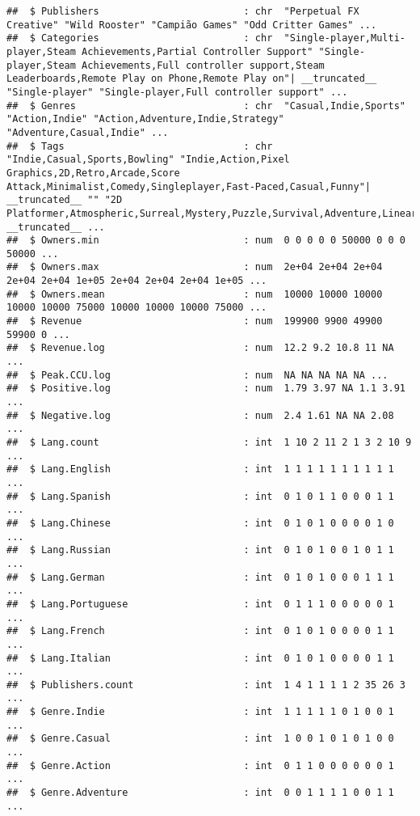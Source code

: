 \documentclass[
]{article}
\begin{document}
\begin{verbatim}
##  $ Publishers                         : chr  "Perpetual FX Creative" "Wild Rooster" "Campião Games" "Odd Critter Games" ...
##  $ Categories                         : chr  "Single-player,Multi-player,Steam Achievements,Partial Controller Support" "Single-player,Steam Achievements,Full controller support,Steam Leaderboards,Remote Play on Phone,Remote Play on"| __truncated__ "Single-player" "Single-player,Full controller support" ...
##  $ Genres                             : chr  "Casual,Indie,Sports" "Action,Indie" "Action,Adventure,Indie,Strategy" "Adventure,Casual,Indie" ...
##  $ Tags                               : chr  "Indie,Casual,Sports,Bowling" "Indie,Action,Pixel Graphics,2D,Retro,Arcade,Score Attack,Minimalist,Comedy,Singleplayer,Fast-Paced,Casual,Funny"| __truncated__ "" "2D Platformer,Atmospheric,Surreal,Mystery,Puzzle,Survival,Adventure,Linear,Singleplayer,Experimental,Platformer"| __truncated__ ...
##  $ Owners.min                         : num  0 0 0 0 0 50000 0 0 0 50000 ...
##  $ Owners.max                         : num  2e+04 2e+04 2e+04 2e+04 2e+04 1e+05 2e+04 2e+04 2e+04 1e+05 ...
##  $ Owners.mean                        : num  10000 10000 10000 10000 10000 75000 10000 10000 10000 75000 ...
##  $ Revenue                            : num  199900 9900 49900 59900 0 ...
##  $ Revenue.log                        : num  12.2 9.2 10.8 11 NA ...
##  $ Peak.CCU.log                       : num  NA NA NA NA NA ...
##  $ Positive.log                       : num  1.79 3.97 NA 1.1 3.91 ...
##  $ Negative.log                       : num  2.4 1.61 NA NA 2.08 ...
##  $ Lang.count                         : int  1 10 2 11 2 1 3 2 10 9 ...
##  $ Lang.English                       : int  1 1 1 1 1 1 1 1 1 1 ...
##  $ Lang.Spanish                       : int  0 1 0 1 1 0 0 0 1 1 ...
##  $ Lang.Chinese                       : int  0 1 0 1 0 0 0 0 1 0 ...
##  $ Lang.Russian                       : int  0 1 0 1 0 0 1 0 1 1 ...
##  $ Lang.German                        : int  0 1 0 1 0 0 0 1 1 1 ...
##  $ Lang.Portuguese                    : int  0 1 1 1 0 0 0 0 0 1 ...
##  $ Lang.French                        : int  0 1 0 1 0 0 0 0 1 1 ...
##  $ Lang.Italian                       : int  0 1 0 1 0 0 0 0 1 1 ...
##  $ Publishers.count                   : int  1 4 1 1 1 1 2 35 26 3 ...
##  $ Genre.Indie                        : int  1 1 1 1 1 0 1 0 0 1 ...
##  $ Genre.Casual                       : int  1 0 0 1 0 1 0 1 0 0 ...
##  $ Genre.Action                       : int  0 1 1 0 0 0 0 0 0 1 ...
##  $ Genre.Adventure                    : int  0 0 1 1 1 1 0 0 1 1 ...

\end{verbatim}
\end{document}
